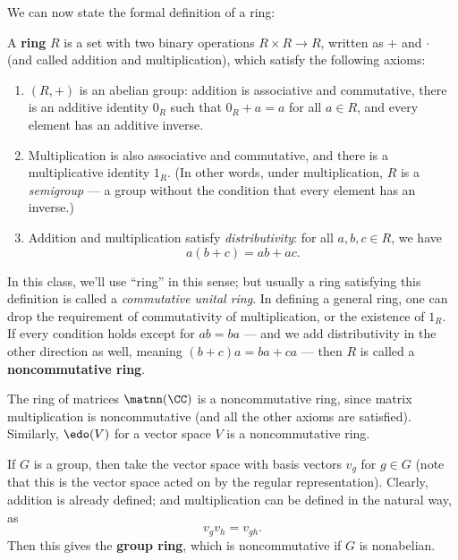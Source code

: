 We can now state the formal definition of a ring:

\begin{definition}
A \textbf{ring} $R$ is a set with two binary operations $R \times R \to R$, written as $+$ and $\cdot$ (and called addition and multiplication), which satisfy the following axioms: 
    \begin{enumerate}
        \item $(R, +)$ is an abelian group: addition is associative and commutative, there is an additive identity $0_R$ such that $0_R + a = a$ for all $a \in R$, and every element has an additive inverse. 
        \item Multiplication is also associative and commutative, and there is a multiplicative identity $1_R$. (In other words, under multiplication, $R$ is a \emph{semigroup} --- a group without the condition that every element has an inverse.)
        \item Addition and multiplication satisfy \emph{distributivity}: for all $a, b, c \in R$, we have \[a(b + c) = ab + ac.\] 
    \end{enumerate}
\end{definition}
    

In this class, we'll use ``ring'' in this sense; but usually a ring satisfying this definition is called a \emph{commutative unital ring}. In defining a general ring, one can drop the requirement of commutativity of multiplication, or the existence of $1_R$. If every condition holds except for $ab = ba$ --- and we add distributivity in the other direction as well, meaning $(b + c)a = ba + ca$ --- then $R$ is called a \textbf{noncommutative ring}. 


\begin{example}[Matrices]
The ring of matrices $\matnn(\CC)$ is a noncommutative ring, since matrix multiplication is noncommutative (and all the other axioms are satisfied). Similarly, $\edo(V)$ for a vector space $V$ is a noncommutative ring.
\end{example}

\begin{example}
If $G$ is a group, then take the vector space with basis vectors $v_g$ for $g \in G$ (note that this is the vector space acted on by the regular representation). Clearly, addition is already defined; and multiplication can be defined in the natural way, as \[v_gv_h = v_{gh}.\] Then this gives the \textbf{group ring}, which is noncommutative if $G$ is nonabelian. 
\end{example}

